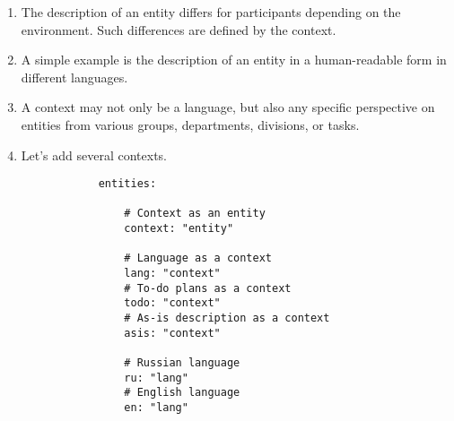 \documentclass[final]{article}
\begin{document}
        \begin{enumerate}

            \item The description of an entity differs for participants depending on the environment. Such differences are defined by the context.

            \item A simple example is the description of an entity in a human-readable form in different languages.

            \item A context may not only be a language, but also any specific perspective on entities from various groups, departments, divisions, or tasks.

            \item Let's add several contexts.

            \begin{verbatim}
            entities:

                # Context as an entity
                context: "entity"

                # Language as a context
                lang: "context"
                # To-do plans as a context
                todo: "context"
                # As-is description as a context
                asis: "context"

                # Russian language
                ru: "lang"
                # English language
                en: "lang"

            \end{verbatim}

        \end{enumerate}
\end{document}
